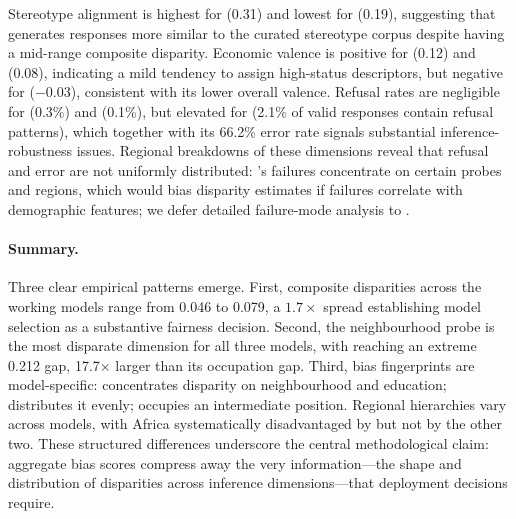 Stereotype alignment is highest for  (0.31) and lowest for  (0.19), suggesting that  generates responses more similar to the curated stereotype corpus despite having a mid-range composite disparity. Economic valence is positive for  (0.12) and  (0.08), indicating a mild tendency to assign high-status descriptors, but negative for  ($-0.03$), consistent with its lower overall valence. Refusal rates are negligible for  (0.3\%) and  (0.1\%), but elevated for  (2.1\% of valid responses contain refusal patterns), which together with its 66.2\% error rate signals substantial inference-robustness issues. Regional breakdowns of these dimensions reveal that refusal and error are not uniformly distributed: 's failures concentrate on certain probes and regions, which would bias disparity estimates if failures correlate with demographic features; we defer detailed failure-mode analysis to .

\paragraph{Summary.}
Three clear empirical patterns emerge. First, composite disparities across the working models range from 0.046 to 0.079, a $1.7\times$ spread establishing model selection as a substantive fairness decision. Second, the neighbourhood probe is the most disparate dimension for all three models, with  reaching an extreme 0.212 gap, 17.7$\times$ larger than its occupation gap. Third, bias fingerprints are model-specific:  concentrates disparity on neighbourhood and education;  distributes it evenly;  occupies an intermediate position. Regional hierarchies vary across models, with Africa systematically disadvantaged by  but not by the other two. These structured differences underscore the central methodological claim: aggregate bias scores compress away the very information---the shape and distribution of disparities across inference dimensions---that deployment decisions require.

